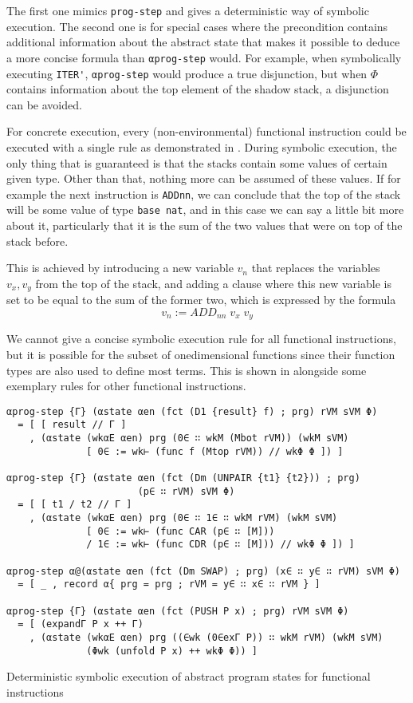 The first one mimics \verb/prog-step/ and gives a deterministic way of symbolic execution.
The second one is for special cases where the precondition contains additional information
about the abstract state
that makes it possible to deduce a more concise formula than \verb/αprog-step/ would.
For example, when symbolically executing \verb/ITER'/, \verb/αprog-step/ would produce
a true disjunction, but when $\Phi$ contains information about the top element of the
shadow stack, a disjunction can be avoided.

For concrete execution, every (non-environmental) functional instruction could be executed
with a single rule as demonstrated in .
During symbolic execution, the only thing that is guaranteed is
that the stacks contain some values of certain given type.
Other than that, nothing more can be assumed of these values.
If for example the next instruction is \verb/ADDnn/, we can conclude that the top of the stack
will be some value of type \verb/base nat/, and in this case we can say a little bit more about
it, particularly that it is the sum of the two values that were on top of the stack before.

This is achieved by introducing a new variable $v_n$ that replaces the
variables $v_x, v_y$ from the top of the stack,
and adding a clause where this new variable is set to be equal to the sum of the former two,
which is expressed by the formula
\[	v_n := ADD_{nn}\; v_x\; v_y
\]

We cannot give a concise symbolic execution rule for all functional instructions,
but it is possible for the subset of onedimensional functions since their
function types are also used to define most terms.
This is shown in  alongside some exemplary rules for other functional
instructions.

\begin{listing}[!ht]
\begin{verbatim}
αprog-step {Γ} (αstate αen (fct (D1 {result} f) ; prg) rVM sVM Φ)
  = [ [ result // Γ ]
    , (αstate (wkαE αen) prg (0∈ ∷ wkM (Mbot rVM)) (wkM sVM)
              [ 0∈ := wk⊢ (func f (Mtop rVM)) // wkΦ Φ ]) ]

αprog-step {Γ} (αstate αen (fct (Dm (UNPAIR {t1} {t2})) ; prg)
                       (p∈ ∷ rVM) sVM Φ)
  = [ [ t1 / t2 // Γ ]
    , (αstate (wkαE αen) prg (0∈ ∷ 1∈ ∷ wkM rVM) (wkM sVM)
              [ 0∈ := wk⊢ (func CAR (p∈ ∷ [M]))
              / 1∈ := wk⊢ (func CDR (p∈ ∷ [M])) // wkΦ Φ ]) ]

αprog-step α@(αstate αen (fct (Dm SWAP) ; prg) (x∈ ∷ y∈ ∷ rVM) sVM Φ)
  = [ _ , record α{ prg = prg ; rVM = y∈ ∷ x∈ ∷ rVM } ]

αprog-step {Γ} (αstate αen (fct (PUSH P x) ; prg) rVM sVM Φ)
  = [ (expandΓ P x ++ Γ)
    , (αstate (wkαE αen) prg ((∈wk (0∈exΓ P)) ∷ wkM rVM) (wkM sVM)
              (Φwk (unfold P x) ++ wkΦ Φ)) ]
\end{verbatim}
\caption{Deterministic symbolic execution of abstract program states for functional instructions}
\label{aprog-step-func}
\end{listing}

